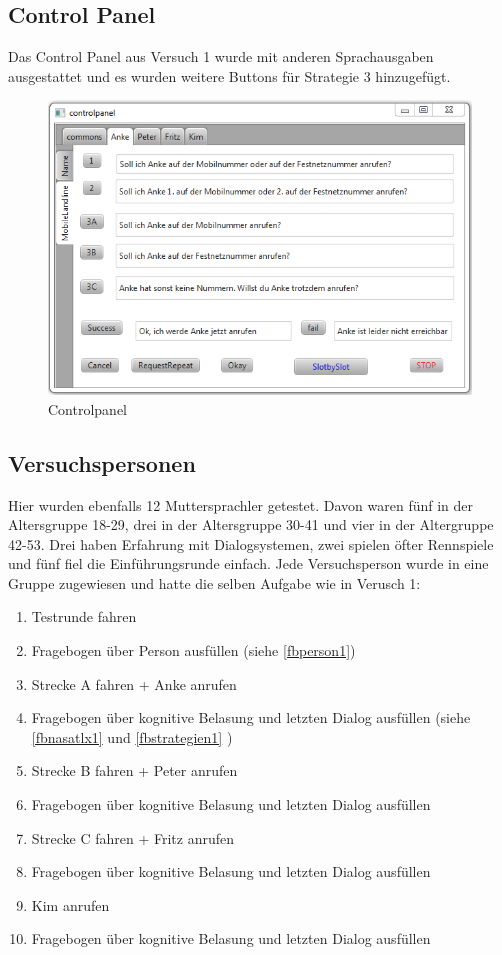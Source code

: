 \documentclass[12pt,a4paper]{scrartcl}
\begin{document}
\subsection{Control Panel}
Das Control Panel aus Versuch 1 wurde mit anderen Sprachausgaben ausgestattet und es wurden weitere Buttons für Strategie 3 hinzugefügt. 
\begin{figure}[htbp]
\includegraphics{controlpanel.png}
\caption{Controlpanel}
\label{cp1}
\end{figure}


\subsection{Versuchspersonen}

Hier wurden ebenfalls 12 Muttersprachler getestet. Davon waren fünf in der Altersgruppe 18-29, drei in der Altersgruppe 30-41 und vier in der Altergruppe 42-53. Drei haben Erfahrung mit Dialogsystemen, zwei spielen öfter Rennspiele und fünf fiel die Einführungsrunde einfach. Jede Versuchsperson wurde in eine Gruppe zugewiesen und hatte die selben Aufgabe wie in Verusch 1: 
\begin{enumerate}
\item Testrunde fahren
\item Fragebogen über Person ausfüllen (siehe \ref{fbperson1})
\item Strecke A fahren + Anke anrufen
\item Fragebogen über kognitive Belasung und letzten Dialog ausfüllen (siehe \ref{fbnasatlx1} und \ref{fbstrategien1} )
\item Strecke B fahren + Peter anrufen
\item Fragebogen über kognitive Belasung und letzten Dialog ausfüllen
\item Strecke C fahren + Fritz anrufen
\item Fragebogen über kognitive Belasung und letzten Dialog ausfüllen 
\item Kim anrufen
\item Fragebogen über kognitive Belasung und letzten Dialog ausfüllen 
\end{enumerate}
\end{document}
